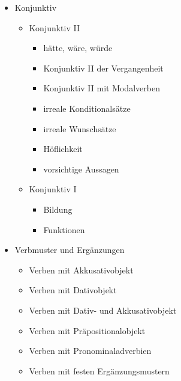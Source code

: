 \documentclass[a4paper]{article}
\begin{document}
\begin{itemize}
\begin{itemize}
                \item Konjunktiv
                \begin{itemize}
                    \item Konjunktiv II
                    \begin{itemize}
                        \item hätte, wäre, würde
                        \item Konjunktiv II der Vergangenheit
                        \item Konjunktiv II mit Modalverben
                        \item irreale Konditionalsätze
                        \item irreale Wunschsätze
                        \item Höflichkeit
                        \item vorsichtige Aussagen
                    \end{itemize}
                    \item Konjunktiv I
                    \begin{itemize}
                        \item Bildung
                        \item Funktionen
                    \end{itemize}
                \end{itemize}
                
                \item Verbmuster und Ergänzungen
                \begin{itemize}
                    \item Verben mit Akkusativobjekt
                    \item Verben mit Dativobjekt
                    \item Verben mit Dativ- und Akkusativobjekt
                    \item Verben mit Präpositionalobjekt
                    \item Verben mit Pronominaladverbien
                    \item Verben mit festen Ergänzungsmustern
                \end{itemize}
                

\end{itemize}
\end{itemize}
\end{document}
